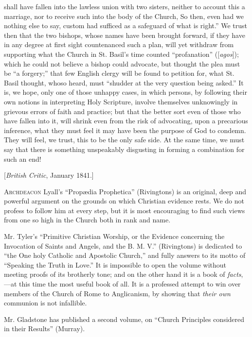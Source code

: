 shall have fallen into the lawless union with two sisters, neither to
account this a marriage, nor to receive such into the body of the
Church, So then, even had we nothing else to say, custom had sufficed as
a safeguard of what is right.'' We trust then that the two bishops, whose
names have been brought forward, if they have in any degree at first
sight countenanced such a plan, will yet withdraw from supporting what
the Church in St. Basil's time counted ``profanation'' ([\emph{agos}]);
which he could not believe a bishop could advocate, but thought the plea
must be ``a forgery;'' that few English clergy will be found to petition
for, what St. Basil thought, whoso heard, must ``shudder at the very
question being asked.'' It is, we hope, only one of those unhappy cases,
in which persons, by following their own notions in interpreting Holy
Scripture, involve themselves unknowingly in grievous errors of faith
and practice; but that the better sort even of those who have fallen
into it, will shrink even from the risk of advocating, upon a precarious
inference, what they must feel it may have been the purpose of God to
condemn. They will feel, we trust, this to be the only safe side. At the
same time, we must say that there is something unspeakably disgusting in
forming a combination for such an end!


[\emph{British Critic}, January 1841.]

A\textsc{rchdeacon} Lyall's ``Propædia
Prophetica'' (Rivingtons) is an original, deep and powerful argument on
the grounds on which Christian evidence rests. We do not profess to
follow him at every step, but it is most encouraging to find such views
from one so high in the Church both in rank and name.

Mr. Tyler's ``Primitive Christian Worship, or the
Evidence concerning the Invocation of Saints and Angels, and the B. M.
V.'' (Rivingtons) is dedicated to ``the One holy Catholic and Apostolic
Church,'' and fully answers to its motto of ``Speaking the Truth in Love.''
It is impossible to open the volume without meeting proofs of its
brotherly tone; and on the other hand it is a book of \emph{facts},—at
this time the most useful book of all. It is a professed attempt to win
over members of the Church of Rome to Anglicanism, by showing that \emph{their
own} communion is not
infallible.

Mr. Gladstone has published a second volume, on ``Church
Principles considered in their Results'' (Murray).

